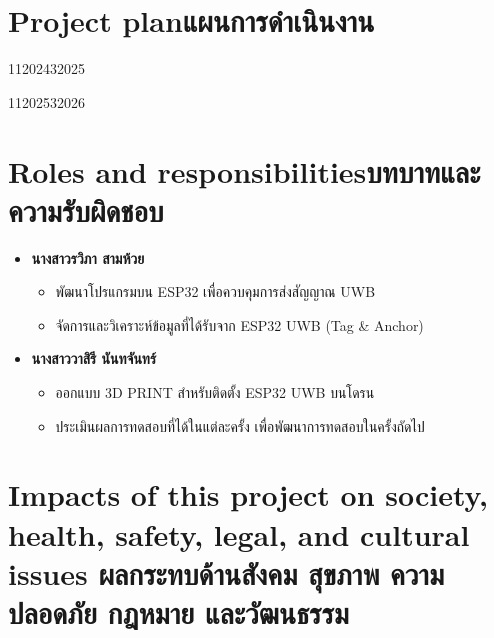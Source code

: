 \section{\ifenglish Project plan\else แผนการดำเนินงาน\fi}

\begin{plan}{11}{2024}{3}{2025}
\end{plan}
\begin{plan}{11}{2025}{3}{2026}
\end{plan}

\section{\ifenglish Roles and responsibilities\else บทบาทและความรับผิดชอบ\fi}
\begin{itemize}
    \item \textbf{นางสาวรวิภา สามห้วย}
        \begin{itemize}
            \item พัฒนาโปรแกรมบน ESP32 เพื่อควบคุมการส่งสัญญาณ UWB
            \item จัดการและวิเคราะห์ข้อมูลที่ได้รับจาก ESP32 UWB (Tag \& Anchor)
        \end{itemize}

    \item \textbf{นางสาววาสิรี นันทจันทร์}
        \begin{itemize}
            \item ออกแบบ 3D PRINT  สำหรับติดตั้ง ESP32 UWB บนโดรน
            \item ประเมินผลการทดสอบที่ได้ในแต่ละครั้ง เพื่อพัฒนาการทดสอบในครั้งถัดไป
        \end{itemize}
\end{itemize}

\section{\ifenglish%
Impacts of this project on society, health, safety, legal, and cultural issues
\else%
ผลกระทบด้านสังคม สุขภาพ ความปลอดภัย กฎหมาย และวัฒนธรรม
\fi}

